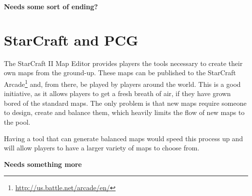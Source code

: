 
\textbf{Needs some sort of ending?}

\section{StarCraft and PCG}
\label{introduction_starcraft_pcg}

The StarCraft II Map Editor provides players the tools necessary to create their own maps from the ground-up. These maps can be published to the StarCraft Arcade\footnote{\url{http://us.battle.net/arcade/en/}} and, from there, be played by players around the world. This is a good initiative, as it allows players to get a fresh breath of air, if they have grown bored of the standard maps. The only problem is that new maps require someone to design, create and balance them, which heavily limits the flow of new maps to the pool.

Having a tool that can generate balanced maps would speed this process up and will allow players to have a larger variety of maps to choose from.

\textbf{Needs something more}